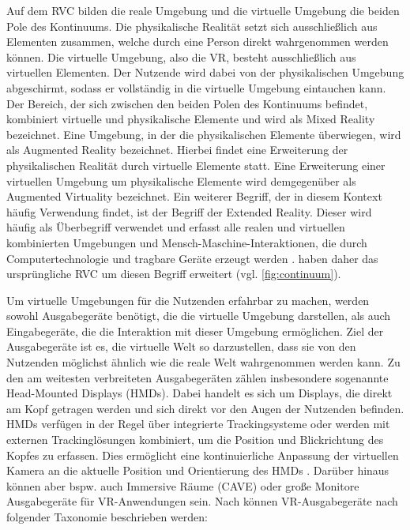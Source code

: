 Auf dem RVC bilden die reale Umgebung und die virtuelle
Umgebung die beiden Pole des Kontinuums. Die physikalische Realität setzt sich ausschließlich aus Elementen zusammen, welche durch eine Person direkt wahrgenommen werden können. Die virtuelle Umgebung, also die VR, besteht ausschließlich aus virtuellen Elementen. Der Nutzende wird dabei von der physikalischen Umgebung abgeschirmt, sodass er vollständig in die virtuelle Umgebung eintauchen kann. Der Bereich, der sich zwischen den beiden Polen des Kontinuums befindet, kombiniert virtuelle und physikalische Elemente und wird als Mixed Reality bezeichnet. Eine Umgebung, in der die physikalischen Elemente überwiegen, wird als Augmented Reality bezeichnet. Hierbei findet eine Erweiterung der physikalischen Realität durch virtuelle Elemente statt. Eine Erweiterung einer virtuellen Umgebung um physikalische Elemente wird demgegenüber als Augmented Virtuality bezeichnet. 
Ein weiterer Begriff, der in diesem Kontext häufig Verwendung findet, ist der Begriff der Extended Reality. Dieser wird häufig als Überbegriff verwendet und erfasst alle realen und virtuellen kombinierten Umgebungen und Mensch-Maschine-Interaktionen, die durch Computertechnologie und tragbare Geräte erzeugt werden \citep{fast-berglund_testing_2018}. \citet{wohlgenannt_virtual_2020} haben daher das ursprüngliche RVC um diesen Begriff erweitert (vgl. \autoref{fig:continuum}). 
 
Um virtuelle Umgebungen für die Nutzenden erfahrbar zu machen, werden sowohl Ausgabegeräte benötigt, die die virtuelle Umgebung darstellen, als auch Eingabegeräte, die die Interaktion mit dieser Umgebung ermöglichen. Ziel der Ausgabegeräte ist es, die virtuelle Welt so darzustellen, dass sie von den Nutzenden möglichst ähnlich wie die reale Welt wahrgenommen werden kann. Zu den am weitesten verbreiteten Ausgabegeräten zählen insbesondere sogenannte Head-Mounted Displays (HMDs). Dabei handelt es sich um Displays, die direkt am Kopf getragen werden und sich direkt vor den Augen der Nutzenden befinden. HMDs verfügen in der Regel über integrierte Trackingsysteme oder werden mit externen Trackinglösungen kombiniert, um die Position und Blickrichtung des Kopfes zu erfassen. Dies ermöglicht eine kontinuierliche Anpassung der virtuellen Kamera an die aktuelle Position und Orientierung des HMDs \citep{dorner_virtual_2019}. Darüber hinaus können aber bspw. auch Immersive Räume (CAVE) oder große Monitore Ausgabegeräte für VR-Anwendungen sein. Nach \citet{somrak_estimating_2019} können VR-Ausgabegeräte nach folgender Taxonomie beschrieben werden: 

